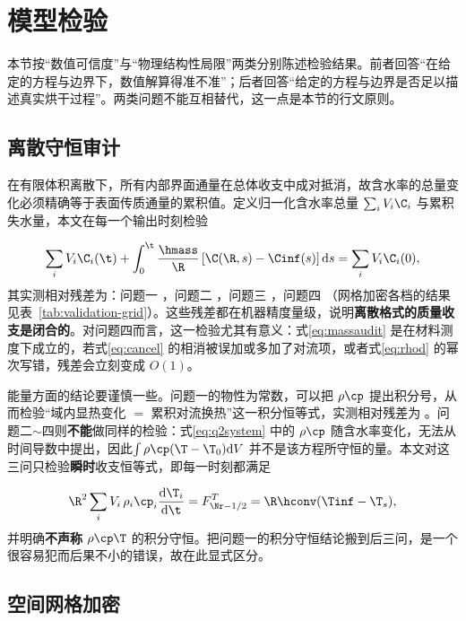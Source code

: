 \section{模型检验}
\label{sec:validation}
\label{sec:evaluation}

本节按``数值可信度''与``物理结构性局限''两类分别陈述检验结果。前者回答``在给定的方程与边界下，数值解算得准不准''；后者回答``给定的方程与边界是否足以描述真实烘干过程''。两类问题不能互相替代，这一点是本节的行文原则。

\subsection{离散守恒审计}

在有限体积离散下，所有内部界面通量在总体收支中成对抵消，故含水率的总量变化必须精确等于表面传质通量的累积值。定义归一化含水率总量 $\sum_iV_i{\C}_i$ 与累积失水量，本文在每一个输出时刻检验

\begin{equation}
\sum_iV_i{\C}_i(\t)+\int_0^\t\frac{\hmass}{\R}\left[\C(\R,s)-\Cinf(s)\right]\mathrm{d}s
=\sum_iV_i{\C}_i(0),
\label{eq:massaudit}
\end{equation}
其实测相对残差为：问题一 \QOneMassError，问题二 \QTwoMassError，问题三 \QThreeMassError，问题四 \QFourMassError（网格加密各档的结果见表~\ref{tab:validation-grid}）。这些残差都在机器精度量级，说明\textbf{离散格式的质量收支是闭合的}。对问题四而言，这一检验尤其有意义：式\eqref{eq:massaudit} 是在材料测度下成立的，若式\eqref{eq:cancel} 的相消被误加或多加了对流项，或者式\eqref{eq:rhod} 的幂次写错，残差会立刻变成 $O(1)$。

能量方面的结论要谨慎一些。问题一的物性为常数，可以把 $\rho\cp$ 提出积分号，从而检验``域内显热变化 $=$ 累积对流换热''这一积分恒等式，实测相对残差为 \QOneEnergyError。问题二$\sim$四则\textbf{不能}做同样的检验：式\eqref{eq:q2system} 中的 $\rho\cp$ 随含水率变化，无法从时间导数中提出，因此$\int\rho\cp(\T-{\T}_0)\mathrm{d}V$ 并不是该方程所守恒的量。本文对这三问只检验\textbf{瞬时}收支恒等式，即每一时刻都满足

\begin{equation}
{\R}^2\sum_iV_i\,\rho_i{\cp}_i\frac{\mathrm{d}{\T}_i}{\mathrm{d}\t}=F^T_{\Nr-1/2}=\R\hconv(\Tinf-{\T}_s),
\end{equation}
并明确\textbf{不声称} $\rho\cp\T$ 的积分守恒。把问题一的积分守恒结论搬到后三问，是一个很容易犯而后果不小的错误，故在此显式区分。

\subsection{空间网格加密}
\label{sec:conv}

